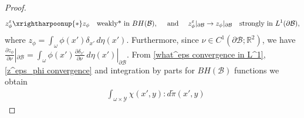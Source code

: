 \documentclass[reqno,10pt]{amsart}
\numberwithin{equation}{section}
\theoremstyle{remark}
\newcommand{\calB}{\mathcal{B}}
\newcommand{\calH}{\mathcal{H}}
\newcommand{\calL}{\mathcal{L}}
\newcommand{\R}{\mathbb{R}}
\newcommand{\calY}{\mathcal{Y}}
\newcommand{\strong}{\to}
\newcommand{\weakstar}{\xrightharpoonup{*}}
\renewcommand{\div}{\operatorname{div}}
\newcommand{\eps}{\varepsilon}
\newcommand{\Mb}{\mathcal{M}_b}
\newcommand{\D}{\nabla}
\begin{document}
\begin{proof}
\begin{equation} \label{z^eps_phi convergence}
	z^\eps_\phi \weakstar z_\phi \quad \text{weakly* in $BH(\calB)$},
	\quad \text{ and } \quad
	z^\eps_\phi|_{\partial \calB} \strong z_\phi|_{\partial \calB} \quad \text{strongly in $L^1(\partial\calB)$},
\end{equation}
where $z_{\phi}=\int_{\omega}\phi(x') \delta_{x'} \,d\eta(x').$
Furthermore, since $\nu \in C^1(\partial\calB;\R^2)$, we have $\frac{\partial z_{\phi}}{\partial \nu}|_{\partial \calB}=\int_{\omega} \phi(x') \frac{\partial \delta_{x'}}{\partial \nu}\, d\eta(x') |_{\partial \calB}$.
From 
\eqref{what^eps convergence in L^1},
\eqref{z^eps_phi convergence} and integration by parts for $BH(\calB)$ functions we obtain
{\allowdisplaybreaks
\begin{align*} 
	& \int_{\omega \times \calY} \chi(x', y) : d\tilde{\pi}(x', y)

\end{align*}}
\end{proof}
\end{document}
